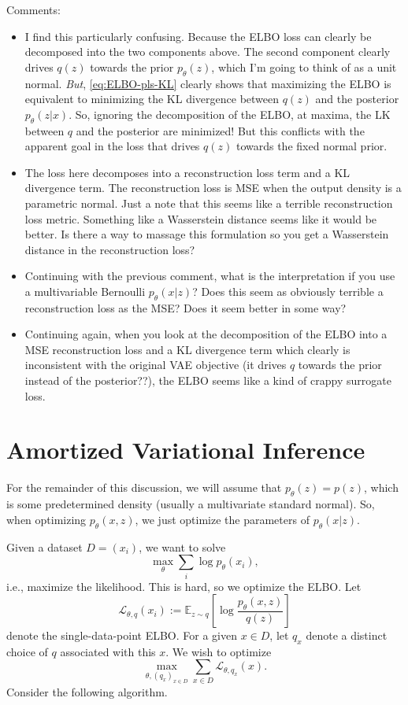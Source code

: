 \documentclass{article}
\newcommand{\E}{\mathbb{E}}
\newcommand{\calL}{\mathcal{L}}
\begin{document}
Comments: 
\begin{itemize}
    \item I find this particularly confusing. Because the ELBO loss can clearly be decomposed into the two components above. The second component clearly drives $q(z)$ towards the prior $p_\theta(z)$, which I'm going to think of as a unit normal. \emph{But}, \eqref{eq:ELBO-pls-KL} clearly shows that maximizing the ELBO is equivalent to minimizing the KL divergence between $q(z)$ and the posterior $p_\theta(z|x)$. So, ignoring the decomposition of the ELBO, at maxima, the LK between $q$ and the posterior are minimized! But this conflicts with the apparent goal in the loss that drives $q(z)$ towards the fixed normal prior. 
    \item The loss here decomposes into a reconstruction loss term and a KL divergence term. The reconstruction loss is MSE when the output density is a parametric normal. Just a note that this seems like a terrible reconstruction loss metric. Something like a Wasserstein distance seems like it would be better. Is there a way to massage this formulation so you get a Wasserstein distance in the reconstruction loss?
    \item Continuing with the previous comment, what is the interpretation if you use a multivariable Bernoulli $p_\theta(x|z)$? Does this seem as obviously terrible a reconstruction loss as the MSE? Does it seem better in some way? 
    \item Continuing again, when you look at the decomposition of the ELBO into a MSE reconstruction loss and a KL divergence term which clearly is inconsistent with the original VAE objective (it drives $q$ towards the prior instead of the posterior??), the ELBO seems like a kind of crappy surrogate loss. 
\end{itemize}

\section{Amortized Variational Inference}
For the remainder of this discussion, we will assume that $p_\theta(z) = p(z)$, which is some predetermined density (usually a multivariate standard normal). So, when optimizing $p_\theta(x,z)$, we just optimize the parameters of $p_\theta(x|z)$. 

Given a dataset $D = (x_i)$, we want to solve 
$$
\max_\theta \sum_i \log p_\theta(x_i),
$$
i.e., maximize the likelihood. This is hard, so we optimize the ELBO. Let
$$
\calL_{\theta, q}(x_i) := \E_{z\sim q}\left[ \log\frac{p_\theta(x,z)}{q(z)}\right]
$$
denote the single-data-point ELBO. For a given $x\in D$, let $q_x$ denote a distinct choice of $q$ associated with this $x$. We wish to optimize
$$
\max_{\theta, (q_x)_{x\in D}} \sum_{x\in D} \calL_{\theta, q_x}(x).
$$
Consider the following algorithm.\\
\end{document}
